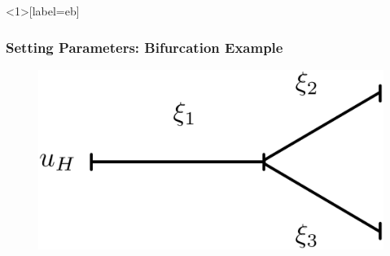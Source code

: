 \documentclass[compress]{beamer}
\begin{document}
\begin{frame}<1>[label=eb]
	\frametitle{Setting Parameters: Bifurcation Example}
	\begin{figure}
		\begin{center}
			\begin{minipage}[t][0.33\paperheight][t]{\textwidth}
				\begin{minipage}{0.44\textwidth}
					\includegraphics[width=\textwidth]{images/bifurcation_1D.eps}
				\end{minipage}
\end{minipage}
\end{center}
\end{figure}
\end{frame}
\end{document}
